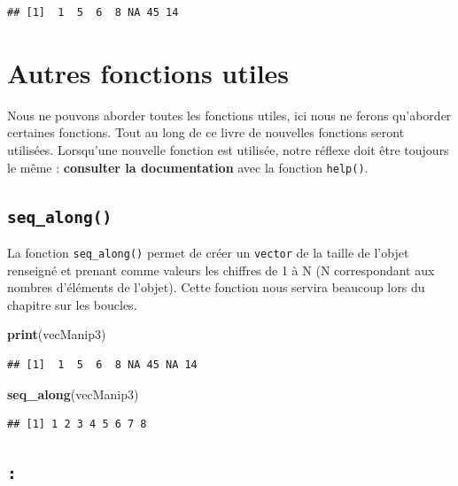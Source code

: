 \documentclass[]{book}
\newenvironment{Shaded}{\begin{snugshade}}{\end{snugshade}}
\newcommand{\KeywordTok}[1]{\textcolor[rgb]{0.13,0.29,0.53}{\textbf{#1}}}
\newcommand{\NormalTok}[1]{#1}
\begin{document}
\begin{verbatim}
## [1]  1  5  6  8 NA 45 14
\end{verbatim}

\hypertarget{autres-fonctions-utiles}{%
\section{Autres fonctions utiles}\label{autres-fonctions-utiles}}

Nous ne pouvons aborder toutes les fonctions utiles, ici nous ne ferons qu'aborder certaines fonctions. Tout au long de ce livre de nouvelles fonctions seront utilisées. Lorsqu'une nouvelle fonction est utilisée, notre réflexe doit être toujours le même : \textbf{consulter la documentation} avec la fonction \texttt{help()}.

\hypertarget{l015seqalong}{%
\subsection{\texorpdfstring{\texttt{seq\_along()}}{seq\_along()}}\label{l015seqalong}}

La fonction \texttt{seq\_along()} permet de créer un \texttt{vector} de la taille de l'objet renseigné et prenant comme valeurs les chiffres de 1 à N (N correspondant aux nombres d'éléments de l'objet). Cette fonction nous servira beaucoup lors du chapitre sur les boucles.

\begin{Shaded}
\begin{Highlighting}[]
\KeywordTok{print}\NormalTok{(vecManip3)}
\end{Highlighting}
\end{Shaded}

\begin{verbatim}
## [1]  1  5  6  8 NA 45 NA 14
\end{verbatim}

\begin{Shaded}
\begin{Highlighting}[]
\KeywordTok{seq_along}\NormalTok{(vecManip3)}
\end{Highlighting}
\end{Shaded}

\begin{verbatim}
## [1] 1 2 3 4 5 6 7 8
\end{verbatim}

\hypertarget{l0152points}{%
\subsection{\texorpdfstring{\texttt{:}}{:}}\label{l0152points}}
\end{document}
